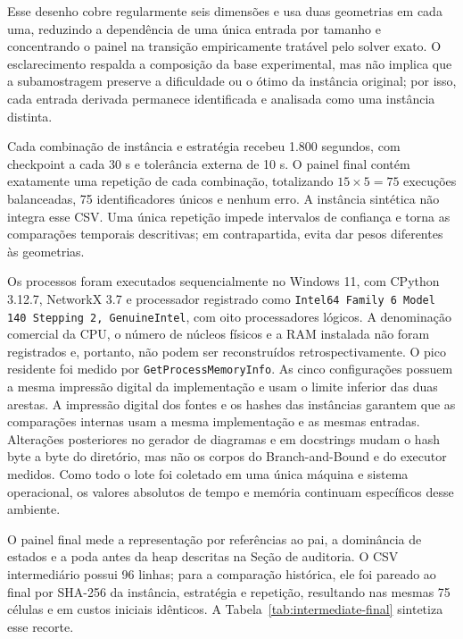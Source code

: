 \documentclass[12pt]{article}
\begin{document}
Esse desenho cobre regularmente seis dimensões e usa duas geometrias em cada
uma, reduzindo a dependência de uma única entrada por tamanho e concentrando o
painel na transição empiricamente tratável pelo solver exato. O esclarecimento
respalda a composição da base experimental, mas não implica que a subamostragem
preserve a dificuldade ou o ótimo da instância original; por isso, cada entrada
derivada permanece identificada e analisada como uma instância distinta.

Cada combinação de instância e estratégia recebeu 1.800 segundos, com checkpoint
a cada 30 s e tolerância externa de 10 s. O painel final contém exatamente uma
repetição de cada combinação, totalizando $15\times5=75$ execuções balanceadas,
75 identificadores únicos e nenhum erro. A instância sintética não integra esse
CSV. Uma única repetição impede intervalos de confiança e torna as comparações
temporais descritivas; em contrapartida, evita dar pesos diferentes às
geometrias.

Os processos foram executados sequencialmente no Windows 11, com CPython
3.12.7, NetworkX 3.7 e processador registrado como \texttt{Intel64 Family 6
Model 140 Stepping 2, GenuineIntel}, com oito processadores lógicos. A
denominação comercial da CPU, o número de núcleos físicos e a RAM instalada não
foram registrados e, portanto, não podem ser reconstruídos retrospectivamente.
O pico residente foi medido por \texttt{GetProcessMemoryInfo}. As cinco
configurações possuem a mesma impressão
digital da implementação e usam o limite inferior das duas arestas. A impressão
digital dos fontes e os hashes das instâncias garantem que as comparações
internas usam a mesma implementação e as mesmas entradas. Alterações posteriores
no gerador de diagramas e em docstrings mudam o hash byte a byte do diretório,
mas não os corpos do Branch-and-Bound e do executor medidos. Como todo o lote
foi coletado em uma única máquina e sistema
operacional, os valores absolutos de tempo e memória continuam específicos
desse ambiente.

O painel final mede a representação por referências ao pai, a dominância de
estados e a poda antes da heap descritas na Seção de auditoria. O CSV
intermediário possui 96 linhas; para a comparação histórica, ele foi pareado ao
final por SHA-256 da instância, estratégia e repetição, resultando nas mesmas 75
células e em custos iniciais idênticos. A
Tabela~\ref{tab:intermediate-final} sintetiza esse recorte.
\end{document}

